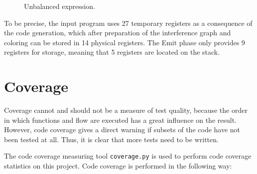 \begin{figure}[H]
    \centering
    
    \caption{Unbalanced expression.} 
    \label{fig:unbalanced_tree}
\end{figure}

To be precise, the input program uses 27 temporary registers as a consequence of the code generation, which after preparation of the interference graph and coloring can be stored in 14 physical registers. The Emit phase only provides 9 registers for storage, meaning that 5 registers are located on the stack.


\section{Coverage}
Coverage cannot and should not be a measure of test quality, because the order in which functions and flow are executed has a great influence on the result. However, code coverage gives a direct warning if subsets of the code have not been tested at all. Thus, it is clear that more tests need to be written.

The code coverage measuring tool \texttt{coverage.py} is used to perform code coverage statistics on this project. Code coverage is performed in the following way:

